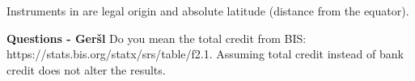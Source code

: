 \documentclass[a4paper,11pt]{article}
\begin{document}
Instruments in \textcite{edisonetal2002} are legal origin and absolute latitude (distance from the equator).

\textbf{Questions - Geršl}
Do you mean the total credit from BIS: https://stats.bis.org/statx/srs/table/f2.1. Assuming total credit instead of bank credit does not alter the results.

\printbibliography
\end{document}

